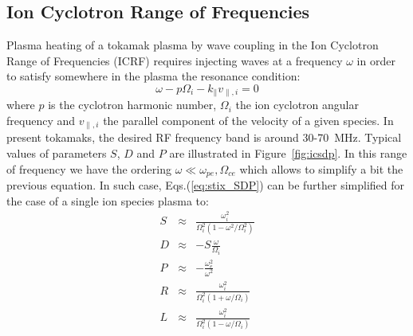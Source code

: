

\subsection{Ion Cyclotron Range of Frequencies}\label{sec:icrh}
Plasma heating of a tokamak plasma by wave coupling in the Ion Cyclotron Range of Frequencies (ICRF) requires injecting waves at a frequency $\omega$ in order to satisfy somewhere in the plasma the resonance condition:
\begin{equation}
	\omega - p \Omega_i - k_\parallel v_{\parallel,i} = 0
\end{equation}
where $p$ is the cyclotron harmonic number, $\Omega_i$ the ion cyclotron angular frequency and $v_{\parallel,i}$ the parallel component of the velocity of a given species. In present tokamaks, the desired RF frequency band is around 30-70~\si{MHz}. Typical values of parameters $S$, $D$ and $P$ are illustrated in Figure~\ref{fig:icsdp}. In this range of frequency we have the ordering $\omega \ll \omega_{pe},\Omega_{ce}$ which allows to simplify a bit the previous equation. In such case, Eqs.(\ref{eq:stix_SDP}) can be further simplified for the case of a single ion species plasma to:
\begin{subequations}
	\begin{eqnarray}
		S &\approx& \frac{\omega_{i}^2}{\Omega_{i}^2 \left(1 - \omega^2/\Omega_{i}^2 \right)} \\
		D &\approx& - S \frac{\omega}{\Omega_i} \\
		P &\approx& - \frac{\omega_{e}^2}{\omega^2}  \\
		R &\approx& \frac{\omega_i^2}{\Omega_i^2 \left(1+\omega/\Omega_i\right) } \\
		L &\approx& \frac{\omega_i^2}{\Omega_i^2 \left(1-\omega/\Omega_i\right) } 
	\end{eqnarray}
\end{subequations}

